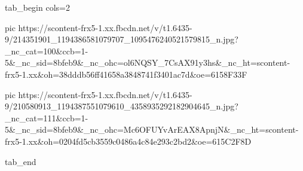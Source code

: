  
 
 
 
 

\ifcmt
  tab_begin cols=2

     pic https://scontent-frx5-1.xx.fbcdn.net/v/t1.6435-9/214351901_1194386581079707_1095476240521579815_n.jpg?_nc_cat=100&ccb=1-5&_nc_sid=8bfeb9&_nc_ohc=ol6NQSY_7CsAX91y3hs&_nc_ht=scontent-frx5-1.xx&oh=38dddb56ff41658a3848741f3401ac7d&oe=6158F33F

     pic https://scontent-frx5-1.xx.fbcdn.net/v/t1.6435-9/210580913_1194387551079610_4358935292182904645_n.jpg?_nc_cat=111&ccb=1-5&_nc_sid=8bfeb9&_nc_ohc=Mc6OFUYvArEAX8ApnjN&_nc_ht=scontent-frx5-1.xx&oh=0204fd5cb3559c0486a4c84e293c2bd2&oe=615C2F8D

  tab_end
\fi
